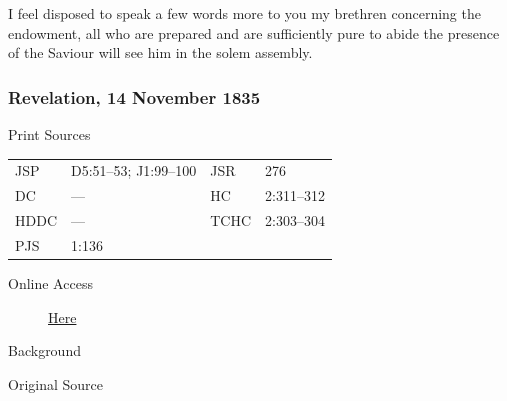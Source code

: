 				I feel disposed to speak a few words more to you my brethren concerning the endowment, all who are prepared and are sufficiently pure to abide the presence of the Saviour will see him in the solem assembly.
				
		\subsubsection{Revelation, 14 November 1835}
			\label{EMS-1835-JS-14-NOV-1835}
			
			\begin{description}
				\item[Print Sources]
			\end{description}

				\begin{tabular}{p{0.5in}p{1in}p{0.5in}p{1in}}
				JSP	 	& D5:51--53; J1:99--100		& JSR 		& 276 \\
				DC	 	& --- 			& HC 		& 2:311--312 \\
				HDDC 	& ---			& TCHC 		& 2:303--304 \\
				PJS 	& 1:136			& 	 		&  \\
				\end{tabular}
			
			\begin{description}
				\item[Online Access] \href{https://www.josephsmithpapers.org/paper-summary/revelation-14-november-1835/1}{Here}
			\end{description}
			
			\begin{description}
				\item[Background]
			\end{description}
			
			
			\begin{description}
				\item[Original Source]
			\end{description}
			
